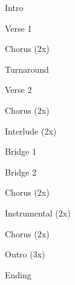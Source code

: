 \documentclass{nnschart}
\begin{document}
\begin{section}{Intro}
\end{section}

\begin{section}{Verse 1}
\end{section}

\begin{section}{Chorus (2x)}
\end{section}

\begin{section}{Turnaround}
\end{section}

\begin{section}{Verse 2}
\end{section}

\begin{section}{Chorus (2x)}
\end{section}

\begin{section}{Interlude (2x)}
\end{section}

\begin{section}{Bridge 1}
\end{section}

\begin{section}{Bridge 2}
\end{section}

\begin{section}{Chorus (2x)}
\end{section}

\begin{section}{Instrumental (2x)}
\end{section}

\begin{section}{Chorus (2x)}
\end{section}

\begin{section}{Outro (3x)}
\end{section}

\begin{section}{Ending}
\end{section}
\end{document}
